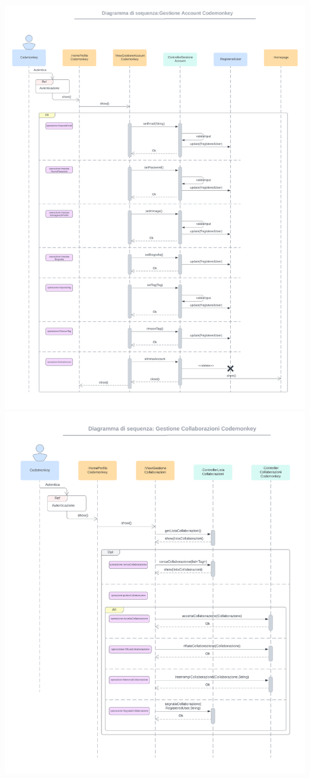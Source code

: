 \includegraphics[width=\textwidth,height=\textheight,keepaspectratio]{assets/img/sequenza/codemonkey-1.png}
\newpage
\includegraphics[width=\textwidth,height=\textheight,keepaspectratio]{assets/img/sequenza/codemonkey-2.png}
